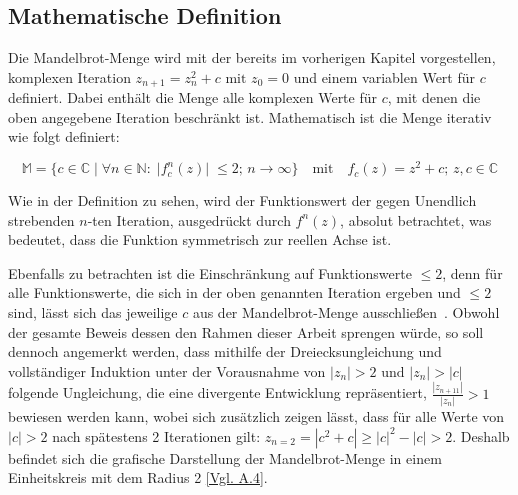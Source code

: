 \subsection{Mathematische Definition}\label{subsec:mathematical-definition}

Die Mandelbrot-Menge wird mit der bereits im vorherigen Kapitel vorgestellen,
komplexen Iteration $z_{n+1} = z_n^2 + c \text{ mit } z_0 = 0$ und einem variablen
Wert für $c$~\cite*[S.25]{schuh_fraktale_2017} definiert.
Dabei enthält die Menge alle komplexen Werte für $c$, mit denen die
oben angegebene Iteration beschränkt ist.
Mathematisch ist die Menge iterativ wie folgt definiert:

\begin{equation}\label{eq:mathematical-definition}
  \mathbb{M} = \{c \in \mathbb{C} \; |\;  \forall n \in \mathbb{N}:\; |f_c^n(z)|\; \leqslant 2;\, n \to \infty\}
  \quad
  \text{mit}
  \quad
  f_c(z) = z^2 + c;\, z,c \in \mathbb{C}
\end{equation}

Wie in der Definition zu sehen, wird der Funktionswert der
gegen Unendlich strebenden $n$-ten Iteration, ausgedrückt durch $f^n(z)$,
absolut betrachtet, was bedeutet, dass die Funktion symmetrisch zur reellen Achse ist.

Ebenfalls zu betrachten ist die Einschränkung auf Funktionswerte $\leqslant 2$, denn
für alle Funktionswerte, die sich in der oben genannten Iteration ergeben
und $\leqslant 2$ sind, lässt sich das jeweilige $c$ aus der Mandelbrot-Menge
ausschließen~\cite{munafo_escape_1997}.
Obwohl der gesamte Beweis dessen den Rahmen dieser Arbeit sprengen würde,
so soll dennoch angemerkt werden, dass mithilfe der Dreiecksungleichung und
vollständiger Induktion unter der Vorausnahme von $|z_n| > 2 \text{ und } |z_n| > |c|$
folgende Ungleichung, die eine divergente Entwicklung repräsentiert,
$\frac{|z_{n+11}|}{|z_n|} > 1$ bewiesen werden kann, wobei sich zusätzlich zeigen
lässt, dass für alle Werte von $|c| > 2$ nach spätestens 2 Iterationen gilt:
$z_{n=2} = |c^2 + c| \geqslant |c|^2 - |c| > 2$.
Deshalb befindet sich die grafische Darstellung der Mandelbrot-Menge in einem
Einheitskreis mit dem Radius 2 \hyperref[app:4]{[Vgl. A.4]}.